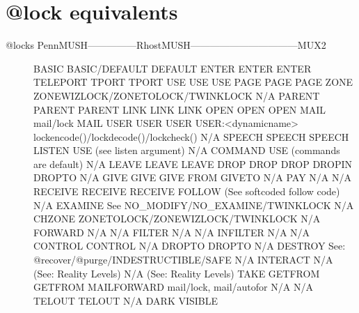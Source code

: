 \documentclass[letterpaper,10pt,english]{sphinxmanual}
\begin{document}
\section{@lock equivalents}
\label{\detokenize{31-comparison:lock-equivalents}}\begin{description}
\item[{@locks PennMUSH—————RhostMUSH———————————\textendash{}MUX2}] \leavevmode
\sphinxAtStartPar
BASIC                  BASIC/DEFAULT                               DEFAULT
ENTER                  ENTER                                       ENTER
TELEPORT               TPORT                                       TPORT
USE                    USE                                         USE
PAGE                   PAGE                                        PAGE
ZONE                   ZONEWIZLOCK/ZONETOLOCK/TWINKLOCK            N/A
PARENT                 PARENT                                      PARENT
LINK                   LINK                                        LINK
OPEN                   OPEN                                        OPEN
MAIL                   mail/lock                                   MAIL
USER                   USER                                        USER
USER:\textless{}dynamicname\textgreater{}     lockencode()/lockdecode()/lockcheck()       N/A
SPEECH                 SPEECH                                      SPEECH
LISTEN                 USE (see listen argument)                   N/A
COMMAND                USE (commands are default)                  N/A
LEAVE                  LEAVE                                       LEAVE
DROP                   DROP                                        DROP
DROPIN                 DROPTO                                      N/A
GIVE                   GIVE                                        GIVE
FROM                   GIVETO                                      N/A
PAY                    N/A                                         N/A
RECEIVE                RECEIVE                                     RECEIVE
FOLLOW                 (See softcoded follow code)                 N/A
EXAMINE                See NO\_MODIFY/NO\_EXAMINE/TWINKLOCK          N/A
CHZONE                 ZONETOLOCK/ZONEWIZLOCK/TWINKLOCK            N/A
FORWARD                N/A                                         N/A
FILTER                 N/A                                         N/A
INFILTER               N/A                                         N/A
CONTROL                CONTROL                                     N/A
DROPTO                 DROPTO                                      N/A
DESTROY                See: @recover/@purge/INDESTRUCTIBLE/SAFE    N/A
INTERACT               N/A (See: Reality Levels)                   N/A (See: Reality Levels)
TAKE                   GETFROM                                     GETFROM
MAILFORWARD            mail/lock, mail/autofor                     N/A
N/A                    TELOUT                                      TELOUT
N/A                    DARK                                        VISIBLE

\end{description}
\end{document}
